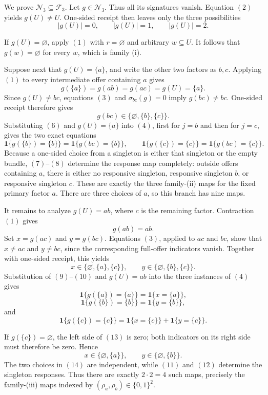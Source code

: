 We prove \(\mathcal N_3\subseteq\mathcal F_3\).  Let
\(g\in\mathcal N_3\).  Thus all its signatures vanish.  Equation
\((2)\) yields \(g(U)\ne U\).  One-sided receipt then leaves only the
three possibilities
\[
|g(U)|=0,
\qquad
|g(U)|=1,
\qquad
|g(U)|=2. \tag{5}
\]

If \(g(U)=\varnothing\), apply \((1)\) with
\(r=\varnothing\) and arbitrary \(w\subseteq U\).  It follows that
\(g(w)=\varnothing\) for every \(w\), which is family (i).

Suppose next that \(g(U)=\{a\}\), and write the other two factors as
\(b,c\).  Applying \((1)\) to every intermediate offer containing
\(a\) gives
\[
g(\{a\})=g(ab)=g(ac)=g(U)=\{a\}. \tag{6}
\]
Since \(g(U)\ne bc\), equations \((3)\) and
\(\sigma_{bc}(g)=0\) imply \(g(bc)\ne bc\).  One-sided receipt
therefore gives
\[
g(bc)\in\{\varnothing,\{b\},\{c\}\}. \tag{7}
\]
Substituting \((6)\) and \(g(U)=\{a\}\) into \((4)\), first for
\(j=b\) and then for \(j=c\), gives the two exact equations
\[
\mathbf 1\{g(\{b\})=\{b\}\}
=\mathbf 1\{g(bc)=\{b\}\},
\qquad
\mathbf 1\{g(\{c\})=\{c\}\}
=\mathbf 1\{g(bc)=\{c\}\}. \tag{8}
\]
Because a one-sided choice from a singleton is either that singleton
or the empty bundle, \((7)\)--\((8)\) determine the response map
completely: outside offers containing \(a\), there is either no
responsive singleton, responsive singleton \(b\), or responsive
singleton \(c\).  These are exactly the three family-(ii) maps for
the fixed primary factor \(a\).  There are three choices of \(a\), so
this branch has nine maps.

It remains to analyze \(g(U)=ab\), where \(c\) is the remaining
factor.  Contraction \((1)\) gives
\[
g(ab)=ab. \tag{9}
\]
Set \(x=g(ac)\) and \(y=g(bc)\).  Equations \((3)\), applied to
\(ac\) and \(bc\), show that \(x\ne ac\) and \(y\ne bc\), since the
corresponding full-offer indicators vanish.  Together with one-sided
receipt, this yields
\[
x\in\{\varnothing,\{a\},\{c\}\},
\qquad
y\in\{\varnothing,\{b\},\{c\}\}. \tag{10}
\]
Substitution of \((9)\)--\((10)\) and \(g(U)=ab\) into the three
instances of \((4)\) gives
\[
\mathbf 1\{g(\{a\})=\{a\}\}
=\mathbf 1\{x=\{a\}\}, \tag{11}
\]
\[
\mathbf 1\{g(\{b\})=\{b\}\}
=\mathbf 1\{y=\{b\}\}, \tag{12}
\]
and
\[
\mathbf 1\{g(\{c\})=\{c\}\}
=\mathbf 1\{x=\{c\}\}+\mathbf 1\{y=\{c\}\}. \tag{13}
\]

If \(g(\{c\})=\varnothing\), the left side of \((13)\) is zero;
both indicators on its right side must therefore be zero.  Hence
\[
x\in\{\varnothing,\{a\}\},
\qquad
y\in\{\varnothing,\{b\}\}. \tag{14}
\]
The two choices in \((14)\) are independent, while \((11)\) and
\((12)\) determine the singleton responses.  Thus there are exactly
\(2\cdot2=4\) such maps, precisely the family-(iii) maps indexed by
\((\rho_a,\rho_b)\in\{0,1\}^2\).

